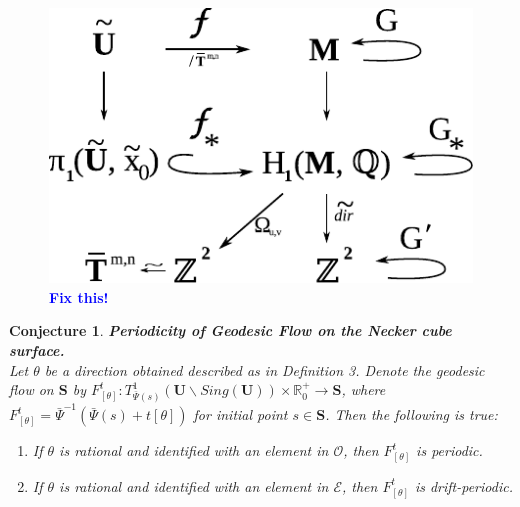 \documentclass[]{article}
\newtheorem*{conj}{Conjecture}
\newcommand{\compav}[1]{\textbf{\textcolor{blue}{#1}}}
\begin{document}
\begin{figure}[H]
\centering
\includegraphics{z2cover.pdf}
\caption{\compav{Fix this!}}
\end{figure}

\begin{conj}{\textbf{Periodicity of Geodesic Flow on the Necker cube surface.}}\\ Let $\theta$ be a direction obtained described as in Definition 3. Denote the geodesic flow on $\mathbf{S}$ by $F^t_{[\theta]}:T^1_{\bar{\Psi}(s)}(\mathbf{U}\backslash Sing(\mathbf U))\times\mathbb{R}_0^+\rightarrow\mathbf{S}$, where $F^t_{[\theta]}=\bar{\Psi}^{-1}(\bar{\Psi}(s)+t[\theta])$ for initial point $s\in\mathbf{S}$. Then the following is true:
\begin{enumerate}[label=(\roman*)]
\item If $\theta$ is rational and identified with an element in $\mathcal{O}$, then $F^t_{[\theta]}$ is periodic.
\item If $\theta$ is rational and identified with an element in $\mathcal{E}$, then $F^t_{[\theta]}$ is drift-periodic.
\end{enumerate}
\end{conj}
\end{document}
